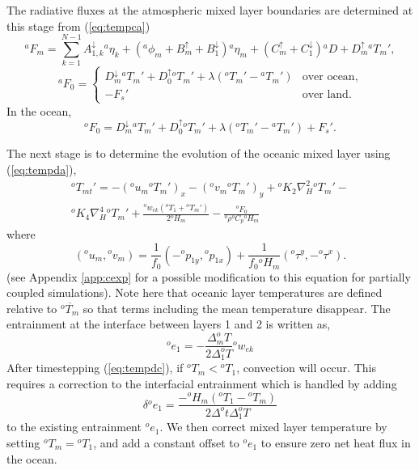 \documentclass[11pt, a4paper,twoside]{article}
\newcommand{\dt}[2]{\Delta_{#2}^{#1}T}
\newcommand{\etb}[2]{{{}^{#1}\eta_{#2}}}
\newcommand{\rhb}[1]{{{}^{#1}\rho}}
\newcommand{\cp}[1]{{{}^{#1}C_p}}
\newcommand{\p}[2]{{{}^{#1}p_{#2}}}
\newcommand{\uu}[2]{{{}^{#1}u_{#2}}}
\newcommand{\vv}[2]{{{}^{#1}v_{#2}}}
\newcommand{\ek}[1]{{{}^{#1}w_{ek}}}
\newcommand{\HH}[2]{{{}^{#1}H_{#2}}}
\newcommand{\kh}[1]{{{}^{#1}K_2}}
\newcommand{\kf}[1]{{{}^{#1}K_4}}
\newcommand{\e}[2]{{{}^{#1}e_{#2}}}
\newcommand{\T}[2]{{{}^{#1}T_{#2}}}
\newcommand{\tx}[2]{{}^{#1}\tau^{#2}}
\newcommand{\adown}[1]{A^{\downarrow}_{#1}}
\newcommand{\bup}[1]{B^{\uparrow}_{#1}}
\newcommand{\cupp}[1]{C^{\uparrow}_{#1}}
\newcommand{\bdown}[1]{B^{\downarrow}_{#1}}
\newcommand{\cdown}[1]{C^{\downarrow}_{#1}}
\newcommand{\dup}[1]{D^{\uparrow}_{#1}}
\newcommand{\ddown}[1]{D^{\downarrow}_{#1}}
\newcommand{\F}[3]{{{}^{#1}F^{#3}_{#2}}}
\newcommand{\lb}[2]{{{}^{#1}\phi_{#2}}}
\newcommand{\D}[1]{{}^{#1}D}
\numberwithin{equation}{section}
\begin{document}
The radiative fluxes at the atmospheric mixed layer boundaries are determined at this stage from (\ref{eq:tempca})
\begin{equation}\label{eq:totrada}
\F{a}{m}{} = \sum_{k=1}^{N-1} \adown{1,k} \etb{a}{k}+(\lb{a}{m}+\bup{m} + \bdown{1})\etb{a}{m} + ( \cupp{m} + \cdown{1} ) \D{a} + \dup{m}\T{a}{m}' ,
\end{equation}
\begin{equation}
\F{a}{0}{}= \begin{cases}
\ddown{m} \T{a}{m}' + \dup{0}\T{o}{m}' + \lambda(\T{o}{m}' - \T{a}{m}') & \text{over ocean,}\\
- F_s'& \text{over land.}
\end{cases}
\end{equation}
In the ocean,
\begin{equation}\label{eq:totrado}
\F{o}{0}{} =  \ddown{m}\T{a}{m}' + \dup{0}\T{o}{m}'  + \lambda (\T{o}{m}' - \T{a}{m}') + F_s' .
\end{equation}

The next stage is to determine the evolution of the oceanic mixed layer using (\ref{eq:tempda}),
\begin{multline}\label{eq:tempdc}
\T{o}{mt}' = - (\uu{o}{m} \T{o}{m}')_x - (\vv{o}{m} \T{o}{m}')_y  +  \kh{o} \nabla_H^2\T{o}{m}'- \\
\kf{o}  \nabla_H^4 \T{o}{m}' + \frac{\ek{o} (\T{o}{1} + \T{o}{m}')}{2 \HH{o}{m}}  - \frac{\F{o}{0}{}}{\rhb{o} \cp{o}\HH{o}{m} }
\end{multline}
where
\[(\uu{o}{m},\vv{o}{m}) = \frac{1}{f_0}(-\p{o}{1y},\p{o}{1x}) + \frac{1}{f_0\HH{o}{m}}(\tx{o}{y},-\tx{o}{x}).\]
(see Appendix \ref{app:cexp} for a possible modification to this equation for partially coupled simulations).
Note here that oceanic layer temperatures are defined relative to $\overline{\T{o}{m}}$ so that terms including the mean temperature disappear.
The entrainment at the interface between layers 1 and 2 is written  as,
\begin{equation}\label{eq:entlay1o_1}
\e{o}{1}= - \frac{\dt{o}{m}}{2 \dt{o}{1}} \ek{o}
\end{equation}
After timestepping (\ref{eq:tempdc}), if $\T{o}{m} < \T{o}{1}$, convection will occur.
This requires a correction to the interfacial entrainment which is handled by adding
\begin{equation}\label{eq:occonv1}
\delta \e{o}{1}= \frac{- \HH{o}{m}(\T{o}{1} - \T{o}{m} )}{2 \Delta^ot \dt{o}{1} }
\end{equation}
to the existing entrainment $\e{o}{1}$.
We then correct mixed layer temperature by setting $\T{o}{m} = \T{o}{1}$, and add a constant offset to $\e{o}{1}$ to ensure zero net heat flux in the ocean.
\end{document}
